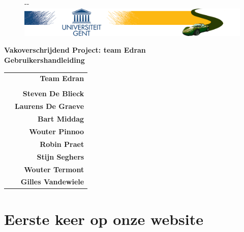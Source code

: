 \documentclass[11pt,a4paper,oneside]{article}
\begin{document}
\begin{titlepage}

\thispagestyle{fancy}
\fancyhf{}
\fancyfoot[L]{}
\begin{figure}[!ht]
  \begin{adjustwidth}{-\oddsidemargin-1in}{-\rightmargin}
    \centering
    \includegraphics[width=\paperwidth]{img/banner}
  \end{adjustwidth}
\end{figure}
\vspace{-0.2em}
\begin{center}
\vspace{5cm}
\Huge \textbf{Vakoverschrijdend Project: team Edran\\ Gebruikershandleiding}\\
\vspace{6.0cm}
\large
\begin{tabular}{L! {} R}
& {\LARGE\bf Team Edran} \\
& \\
& {\bf Steven De Blieck} \\
& {\bf Laurens De Graeve} \\
& {\bf Bart Middag} \\
& {\bf Wouter Pinnoo} \\
& {\bf Robin Praet} \\
& {\bf Stijn Seghers} \\
& {\bf Wouter Termont} \\
& {\bf Gilles Vandewiele} \\
\end{tabular}
\end{center}
\end{titlepage}
\restoregeometry
\newpage

\fancyheadoffset[RO,LE]{0in}

\fancyfoot[L]{}
\fancyfoot[C]{\thepage}
\pagestyle{fancy}
\tableofcontents
\newpage

\section{Eerste keer op onze website}
\end{document}

